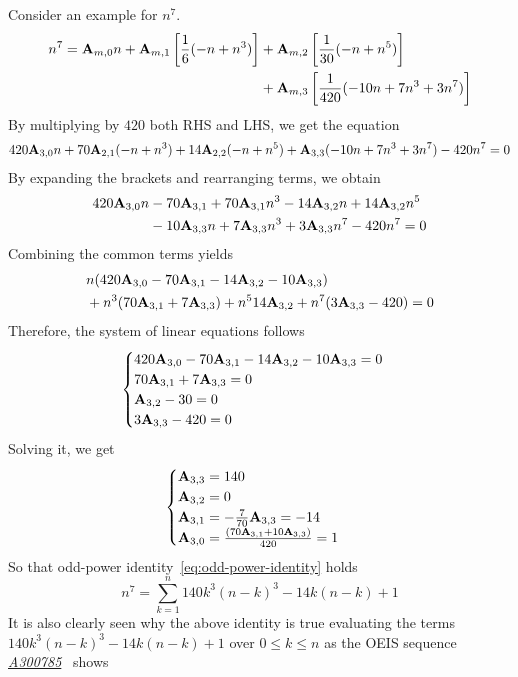 Consider an example for $n^7$.
\begin{align*}
    n^7 =
    {\mathbf{A}} \sb{m,0} n
    + {\mathbf{A}} \sb{m,1} \left[ \frac{1}{6} (-n + n^3) \right]
    &+ {\mathbf{A}} \sb{m,2} \left[ \frac{1}{30} (-n + n^5) \right] \\
    &+ {\mathbf{A}} \sb{m,3} \left[ \frac{1}{420} (-10 n + 7 n^3 + 3 n^7) \right]
\end{align*}
By multiplying by $420$ both RHS and LHS, we get the equation
\begin{align*}
    420 {\mathbf{A}} \sb{3,0} n + 70 {\mathbf{A}} \sb{2,1} (-n + n^3) + 14 {\mathbf{A}} \sb{2,2} (-n + n^5) + {\mathbf{A}} \sb{3,3} (-10 n + 7 n^3 + 3 n^7) - 420n^7 = 0
\end{align*}
By expanding the brackets and rearranging terms, we obtain
\begin{align*}
    420 {\mathbf{A}} \sb{3,0} n
    &- 70 {\mathbf{A}} \sb{3,1} + 70 {\mathbf{A}} \sb{3,1} n^3 - 14 {\mathbf{A}} \sb{3,2} n + 14 {\mathbf{A}} \sb{3,2} n^5 \\
    &- 10 {\mathbf{A}} \sb{3,3} n + 7 {\mathbf{A}} \sb{3,3} n^3 + 3 {\mathbf{A}} \sb{3,3} n^7 - 420n^7 = 0
\end{align*}
Combining the common terms yields
\begin{align*}
    &n (420 {\mathbf{A}} \sb{3,0} - 70 {\mathbf{A}} \sb{3,1} - 14 {\mathbf{A}} \sb{3,2} - 10 {\mathbf{A}} \sb{3,3}) \\
    &+ n^3 (70 {\mathbf{A}} \sb{3,1} + 7 {\mathbf{A}} \sb{3,3})
    + n^5 14 {\mathbf{A}} \sb{3,2}
    + n^7 (3 {\mathbf{A}} \sb{3,3} - 420)
    = 0
\end{align*}
Therefore, the system of linear equations follows
\begin{align*}
    \begin{cases}
    420 {\mathbf{A}} \sb{3,0} - 70 {\mathbf{A}} \sb{3,1} - 14 {\mathbf{A}} \sb{3,2} - 10 {\mathbf{A}} \sb{3,3} = 0 \\
    70 {\mathbf{A}} \sb{3,1} + 7 {\mathbf{A}} \sb{3,3} = 0 \\
    {\mathbf{A}} \sb{3,2} - 30 = 0 \\
    3 {\mathbf{A}} \sb{3,3} - 420 = 0
    \end{cases}
\end{align*}
Solving it, we get
\begin{equation*}
    \begin{cases}
        {\mathbf{A}} \sb{3,3} = 140 \\
        {\mathbf{A}} \sb{3,2} = 0 \\
        {\mathbf{A}} \sb{3,1} = -\frac{7}{70} {\mathbf{A}} \sb{3,3} = -14 \\
        {\mathbf{A}} \sb{3,0} = \frac{(70 {\mathbf{A}} \sb{3,1} + 10 {\mathbf{A}} \sb{3,3})}{420} = 1
    \end{cases}
\end{equation*}
So that odd-power identity~\eqref{eq:odd-power-identity} holds
\begin{equation*}
    n^7 = \sum_{k=1}^{n} 140 k^3 (n-k)^3 - 14k(n-k) + 1
\end{equation*}
It is also clearly seen
why the above identity is true evaluating the terms $140 k^3 (n-k)^3 - 14k(n-k) + 1$ over $0 \leq k \leq n$ as
the OEIS sequence \href{https://oeis.org/A300785}{\textit{A300785}}~\cite{oeis_numerical_triangle_row_sums_give_seventh_powers} shows



